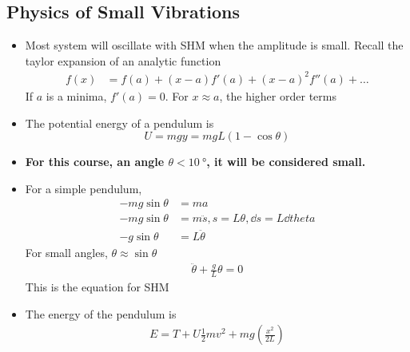 \documentclass[a4paper]{article}
\numberwithin{equation}{section}
\begin{document}
\subsection{Physics of Small Vibrations}
\begin{itemize}
    \item Most system will oscillate with SHM when the amplitude is small. Recall the taylor expansion of an analytic function
    \begin{align}
        f(x)&=f(a)+(x-a)f'(a)+(x-a)^2f''(a)+\dots
    \end{align}
    If $a$ is a minima, $f'(a)=0$. For $x\approx a$, the higher order terms %
    \item The potential energy of a pendulum is \begin{equation}
        U = mgy=mgL(1-\cos\theta)
    \end{equation}
    \item \textbf{For this course, an angle $\theta<\SI{10}{\degree}$, it will be considered small.}
    \item For a simple pendulum,
    \begin{align}
        -mg\sin\theta&=ma\\
        -mg\sin\theta&=m\ddot s, s=L\theta, \dd s=L\dd theta\\
        -g\sin\theta&=L\ddot\theta
    \end{align}
    For small angles, $\theta\approx\sin\theta$
    \begin{align}
        \ddot\theta+\frac{g}{L}\theta=0
    \end{align}
    This is the equation for SHM
    \item The energy of the pendulum is 
    \begin{align}
        E=T+U\frac{1}{2}mv^2+mg\left(\frac{x^2}{2L}\right)
    \end{align}
\end{itemize}
\end{document}
